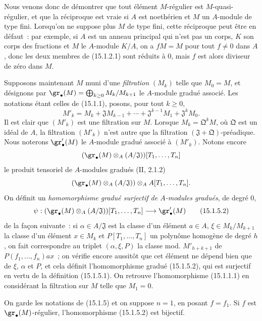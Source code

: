 Nous venons donc de démontrer que tout élément $M$-régulier est
$M$-quasi-régulier, et que la réciproque est vraie si $A$ est noethérien et
$M$ un $A$-module de type fini. Lorsqu'on ne suppose plus $M$ de type fini,
cette réciproque peut être en défaut~: par exemple, si $A$ est un anneau
principal qui n'est pas un corps, $K$ son corps des fractions et $M$ le
$A$-module $K/A$, on a $fM=M$ pour tout $f\neq0$ dans $A$, donc les deux
membres de (15.1.2.1) sont réduits à $0$, mais $f$ est alors diviseur de zéro
dans $M$.

\begin{env}[15.1.5]
\label{0.15.1.5-fr}
Supposons maintenant $M$ muni d'une \emph{filtration} $(M_k)$ telle que
$M_0=M$, et désignons par
$\gr_\bullet(M)=\bigoplus_{k\geq0}M_k/M_{k+1}$ le $A$-module gradué associé.
Les notations étant celles de (15.1.1), posons, pour tout $k\geq0$,
\[
  M'_k=M_k+\mathfrak{J}M_{k-1}+\cdots+
  \mathfrak{J}^{k-1}M_1+\mathfrak{J}^kM_0.
  \tag{15.1.5.1}\label{0.15.1.5.1-fr}
\]
Il est clair que $(M'_k)$ est une filtration sur $M$. Lorsque
$M_k=\mathfrak{Q}^kM$, où $\mathfrak Q$ est un idéal de $A$, la filtration
$(M'_k)$ n'est autre que la filtration
$(\mathfrak{J}+\mathfrak{Q})$-préadique. Nous noterons
$\gr'_\bullet(M)$ le $A$-module gradué associé à $(M'_k)$. Notons encore
\[
  (\gr_\bullet(M)\otimes_A(A/\mathfrak{J}))[T_1,\ldots,T_n]
\]
le produit tensoriel de $A$-modules gradués ($\mathrm{II}$, 2.1.2)
\[
  (\gr_\bullet(M)\otimes_A(A/\mathfrak{J}))
  \otimes_A A[T_1,\ldots,T_n].
\]
On définit un \emph{homomorphisme gradué surjectif de $A$-modules gradués}, de
degré $0$,
\[
  \psi:(\gr_\bullet(M)\otimes_A(A/\mathfrak{J}))[T_1,\ldots,T_n]
  \longrightarrow\gr'_\bullet(M)
  \tag{15.1.5.2}\label{0.15.1.5.2-fr}
\]
de la façon suivante~: si $\alpha\in A/\mathfrak{J}$ est la classe d'un
élément $a\in A$, $\xi\in M_k/M_{k+1}$ la classe d'un élément $x\in M_k$ et
$P[T_1,\ldots,T_n]$ un polynôme homogène de degré $h$, on fait correspondre au
triplet $(\alpha,\xi,P)$ la classe mod. $M'_{h+k+1}$ de
$P(f_1,\ldots,f_n)ax$~; on vérifie encore aussitôt que cet élément ne dépend
bien que de $\xi$, $\alpha$ et $P$, et cela définit l'homomorphisme gradué
(15.1.5.2), qui est surjectif en vertu de la définition (15.1.5.1). On
retrouve l'homomorphisme (15.1.1.1) en considérant la filtration sur $M$ telle
que $M_1=0$.
\end{env}

\begin{lemma}[15.1.6]
\label{0.15.1.6-fr}
On garde les notations de (15.1.5) et on suppose $n=1$, en posant $f=f_1$. Si
$f$ est $\gr_\bullet(M)$-régulier, l'homomorphisme (15.1.5.2) est bijectif.
\end{lemma}

